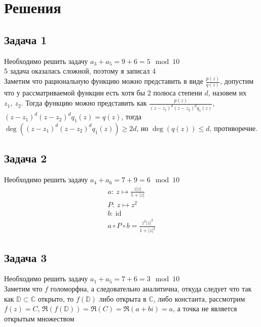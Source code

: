 
\newpage
\section*{Решения}
\subsection*{Задача 1}
	Необходимо решить задачу $a_3 + a_5 = 9 + 6 = 5 \mod 10$\\
	5 задача оказалась сложной, поэтому я записал 4\\
	Заметим что рациональную функцию можно представить в виде $\frac{p(z)}{q(z)}$, допустим что у рассматриваемой функции есть хотя бы 2 полюса степени $d$, назовем их $z_1,\ z_2$. Тогда функцию можно представить как $\frac{p(z)}{(z - z_1)^d (z - z_2)^d q_1(z)}$, $(z - z_1)^d (z - z_2)^d q_1(z) = q(z)$, тогда $\deg((z - z_1)^d (z - z_2)^d q_1(z)) \geqslant 2d$, но $\deg(q(z)) \leqslant d$, противоречие.
\vskip 0.4in

\subsection*{Задача 2}
	Необходимо решить задачу $a_4 + a_6 = 7 + 9 = 6 \mod 10$\\
	\begin{gather*}
		a:\ z \mapsto \frac{z|z|}{1+|z|}\\
		P:\ z \mapsto z^2\\
		b:\ \text{id}\\
		a \circ P \circ b = \frac{z^2|z|^2}{1+|z|^2}
	\end{gather*}
\vskip 0.4in

\subsection*{Задача 3}
	Необходимо решить задачу $a_1 + a_5 = 7 + 6 = 3 \mod 10$\\
	Заметим что $f$ голоморфна, а следовательно аналитична, откуда следует что так как $\mathbb{D} \subset \mathbb{C}$ открыто, то $f(\mathbb{D})$ либо открыта в $\mathbb{C}$, либо константа, рассмотрим $f(z) = C$, $\Re(f(\mathbb{D})) = \Re(C) = \Re(a + bi) = a$, а точка не является открытым множеством
\vskip 0.4in

